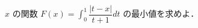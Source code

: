 \documentclass[../../main.tex]{subfiles}
\begin{document}
$x$ の関数 $\displaystyle F(x) = \int_0^1 \dfrac{|t-x|}{t+1} dt$ の最小値を求めよ．
\end{document}
